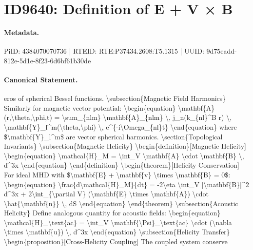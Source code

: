 \section*{ID9640: Definition of E + V × B}
\paragraph{Metadata.}
PiID: 4384070070736 | RTEID: RTE:P37434.2608:T5.1315 | UUID: 9d75eadd-812e-5d1e-8f23-6d6bf61b30de

\paragraph{Canonical Statement.}
eros of spherical Bessel functions. \textbackslash{}subsection\{Magnetic Field Harmonics\} Similarly for magnetic vector potential: \textbackslash{}begin\{equation\} \textbackslash{}mathbf\{A\}(r,\textbackslash{}theta,\textbackslash{}phi,t) = \textbackslash{}sum\_\{nlm\} \textbackslash{}mathbf\{A\}\_\{nlm\} \textbackslash{}, j\_n(k\_\{nl\}\textasciicircum{}B r) \textbackslash{}, \textbackslash{}mathbf\{Y\}\_l\textasciicircum{}m(\textbackslash{}theta,\textbackslash{}phi) \textbackslash{}, e\textasciicircum{}\{-i\textbackslash{}Omega\_\{nl\}t\} \textbackslash{}end\{equation\} where \$\textbackslash{}mathbf\{Y\}\_l\textasciicircum{}m\$ are vector spherical harmonics. \textbackslash{}section\{Topological Invariants\} \textbackslash{}subsection\{Magnetic Helicity\} \textbackslash{}begin\{definition\}[Magnetic Helicity] \textbackslash{}begin\{equation\} \textbackslash{}mathcal\{H\}\_M = \textbackslash{}int\_V \textbackslash{}mathbf\{A\} \textbackslash{}cdot \textbackslash{}mathbf\{B\} \textbackslash{}, d\textasciicircum{}3x \textbackslash{}end\{equation\} \textbackslash{}end\{definition\} \textbackslash{}begin\{theorem\}[Helicity Conservation] For ideal MHD with \$\textbackslash{}mathbf\{E\} + \textbackslash{}mathbf\{v\} \textbackslash{}times \textbackslash{}mathbf\{B\} = 0\$: \textbackslash{}begin\{equation\} \textbackslash{}frac\{d\textbackslash{}mathcal\{H\}\_M\}\{dt\} = -2\textbackslash{}eta \textbackslash{}int\_V |\textbackslash{}mathbf\{B\}|\textasciicircum{}2 d\textasciicircum{}3x + 2\textbackslash{}int\_\{\textbackslash{}partial V\} (\textbackslash{}mathbf\{E\} \textbackslash{}times \textbackslash{}mathbf\{A\}) \textbackslash{}cdot \textbackslash{}hat\{\textbackslash{}mathbf\{n\}\} \textbackslash{}, dS \textbackslash{}end\{equation\} \textbackslash{}end\{theorem\} \textbackslash{}subsection\{Acoustic Helicity\} Define analogous quantity for acoustic fields: \textbackslash{}begin\{equation\} \textbackslash{}mathcal\{H\}\_\textbackslash{}text\{ac\} = \textbackslash{}int\_V \textbackslash{}mathbf\{\textbackslash{}Psi\}\_\textbackslash{}text\{ac\} \textbackslash{}cdot (\textbackslash{}nabla \textbackslash{}times \textbackslash{}mathbf\{u\}) \textbackslash{}, d\textasciicircum{}3x \textbackslash{}end\{equation\} \textbackslash{}subsection\{Helicity Transfer\} \textbackslash{}begin\{proposition\}[Cross-Helicity Coupling] The coupled system conserve

